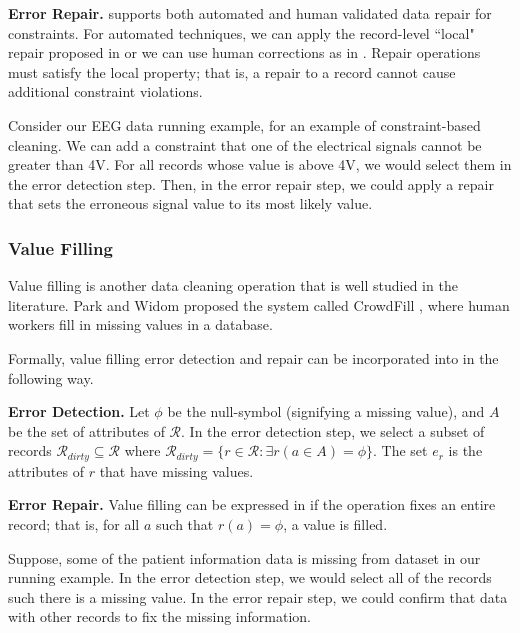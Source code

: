 \vspace{0.5em}

\noindent\textbf{Error Repair. } \sys supports both automated and human validated data repair for constraints. For automated techniques, we can apply the record-level ``local" repair proposed in \cite{DBLP:journals/pvldb/FanLMTY10} or we can use human corrections as in \cite{DBLP:journals/pvldb/YakoutENOI11}. Repair operations must satisfy the local property; that is, a repair to a record cannot cause additional constraint violations.

\begin{example}
Consider our EEG data running example, for an example of constraint-based cleaning.
We can add a constraint that one of the electrical signals cannot be greater than 4V.
For all records whose value is above 4V, we would select them in the error detection step.
Then, in the error repair step, we could apply a repair that sets the erroneous signal value to its most likely value.
\end{example}

\subsubsection{Value Filling}
Value filling is another data cleaning operation that is well studied in the literature.
Park and Widom proposed the system called CrowdFill \cite{park2014crowdfill}, where human workers fill in missing values in a database.

Formally, value filling error detection and repair can be incorporated into \sys in the following way.

\vspace{0.5em}

\noindent\textbf{Error Detection. } Let $\phi$ be the null-symbol (signifying a missing value), and $A$ be the set of attributes of $\mathcal{R}$. In the error detection step, we select a subset of records $\mathcal{R}_{dirty} \subseteq \mathcal{R}$ where $\mathcal{R}_{dirty}=\{r \in \mathcal{R}: \exists r(a\in A) = \phi \}$.
The set $e_r$ is the attributes of $r$ that have missing values.

\vspace{0.5em}

\noindent\textbf{Error Repair. } Value filling can be expressed in \sys if the operation fixes an entire record; that is, for all $a$ such that $r(a) = \phi$, a value is filled.

\begin{example}
Suppose, some of the patient information data is missing from dataset in our running example.
In the error detection step, we would select all of the records such there is a missing value.
In the error repair step, we could confirm that data with other records to fix the missing information.
\end{example}

